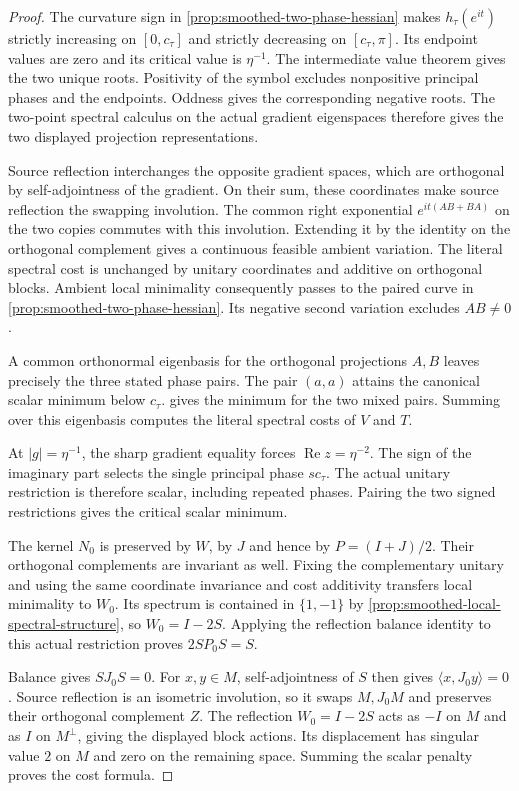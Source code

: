 \begin{proof}
The curvature sign in \cref{prop:smoothed-two-phase-hessian} makes
$h_\tau(e^{it})$ strictly increasing on $[0,c_\tau]$ and strictly
decreasing on $[c_\tau,\pi]$. Its endpoint values are zero and its
critical value is $\eta^{-1}$. The intermediate value theorem gives
the two unique roots. Positivity of the symbol excludes nonpositive
principal phases and the endpoints. Oddness gives the corresponding
negative roots. The two-point spectral calculus on the actual gradient
eigenspaces therefore gives the two displayed projection representations.

Source reflection interchanges the opposite gradient spaces, which are
orthogonal by self-adjointness of the gradient. On their sum, these
coordinates make source reflection the swapping involution. The common
right exponential $e^{it(AB+BA)}$ on the two copies commutes with this
involution. Extending it by the identity on the orthogonal complement
gives a continuous feasible ambient variation. The literal spectral
cost is unchanged by unitary coordinates and additive on orthogonal
blocks. Ambient local minimality consequently passes to the paired
curve in \cref{prop:smoothed-two-phase-hessian}. Its negative second
variation excludes $AB\ne0$.

A common orthonormal eigenbasis for the orthogonal projections $A,B$
leaves precisely the three stated phase pairs. The pair $(a,a)$
attains the canonical scalar minimum below $c_\tau$.
 gives the minimum for the two mixed
pairs. Summing over this eigenbasis computes the literal spectral costs
of $V$ and $T$.

At $|g|=\eta^{-1}$, the sharp gradient equality forces
$\operatorname{Re}z=\eta^{-2}$. The sign of the imaginary part selects
the single principal phase $s c_\tau$. The actual unitary restriction
is therefore scalar, including repeated phases. Pairing the two signed
restrictions gives the critical scalar minimum.

The kernel $N_0$ is preserved by $W$, by $J$ and hence by $P=(I+J)/2$.
Their orthogonal complements are invariant as well. Fixing the
complementary unitary and using the same coordinate invariance and cost
additivity transfers local minimality to $W_0$. Its spectrum is contained
in $\{1,-1\}$ by \cref{prop:smoothed-local-spectral-structure}, so
$W_0=I-2S$. Applying the reflection balance identity to this actual
restriction proves $2SP_0S=S$.

Balance gives $SJ_0S=0$. For $x,y\in M$, self-adjointness of $S$
then gives $\langle x,J_0y\rangle=0$. Source reflection is an
isometric involution, so it swaps $M,J_0M$ and preserves their
orthogonal complement $Z$. The reflection $W_0=I-2S$ acts as $-I$
on $M$ and as $I$ on $M^\perp$, giving the displayed block actions.
Its displacement has singular value $2$ on $M$ and zero on the
remaining space. Summing the scalar penalty proves the cost formula.
\end{proof}

